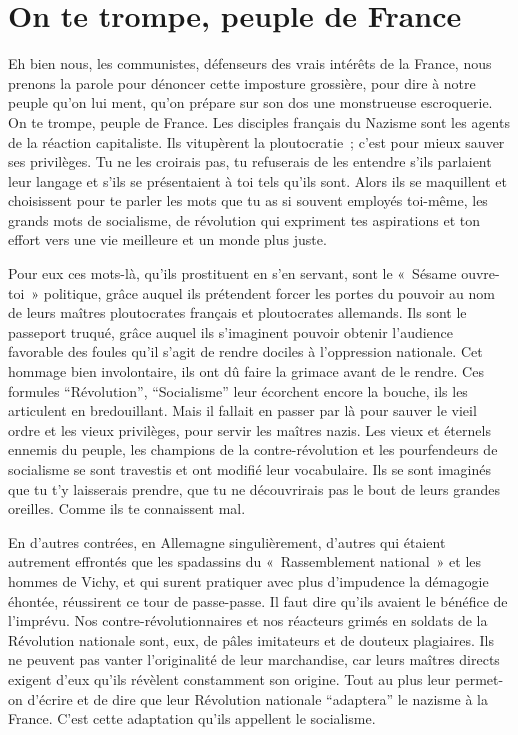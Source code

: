 \documentclass[french,twoside]{book} %
\begin{document}
\section[On te trompe, peuple de France]{On te trompe, peuple de France}
\noindent Eh bien nous, les communistes, défenseurs des vrais intérêts de la France, nous prenons la parole pour dénoncer cette imposture grossière, pour dire à notre peuple qu’on lui ment, qu’on prépare sur son dos une monstrueuse escroquerie. On te trompe, peuple de France. Les disciples français du Nazisme sont les agents de la réaction capitaliste. Ils vitupèrent la ploutocratie ; c’est pour mieux sauver ses privilèges. Tu ne les croirais pas, tu refuserais de les entendre s’ils parlaient leur langage et s’ils se présentaient à toi tels qu’ils sont. Alors ils se maquillent et choisissent pour te parler les mots que tu as si souvent employés toi-même, les grands mots de socialisme, de révolution qui expriment tes aspirations et ton effort vers une vie meilleure et un monde plus juste.\par
Pour eux ces mots-là, qu’ils prostituent en s’en servant, sont le « Sésame ouvre-toi » politique, grâce auquel ils prétendent forcer les portes du pouvoir au nom de leurs maîtres ploutocrates français et ploutocrates allemands. Ils sont le passeport truqué, grâce auquel ils s’imaginent pouvoir obtenir l’audience favorable des foules qu’il s’agit de rendre dociles à l’oppression nationale. Cet hommage bien involontaire, ils ont dû faire la grimace avant de le rendre. Ces formules “Révolution”, “Socialisme” leur écorchent encore la bouche, ils les articulent en bredouillant. Mais il fallait en passer par là pour sauver le vieil ordre et les vieux privilèges, pour servir les maîtres nazis. Les vieux et éternels ennemis du peuple, les champions de la contre-révolution et les pourfendeurs de socialisme se sont travestis et ont modifié leur vocabulaire. Ils se sont imaginés que tu t’y laisserais prendre, que tu ne découvrirais pas le bout de leurs grandes oreilles. Comme ils te connaissent mal.\par
En d’autres contrées, en Allemagne singulièrement, d’autres qui étaient autrement effrontés que les spadassins du « Rassemblement national » et les hommes de Vichy, et qui surent pratiquer avec plus d’impudence la démagogie éhontée, réussirent ce tour de passe-passe. Il faut dire qu’ils avaient le bénéfice de l’imprévu. Nos contre-révolutionnaires et nos réacteurs grimés en soldats de la Révolution nationale sont, eux, de pâles imitateurs et de douteux plagiaires. Ils ne peuvent pas vanter l’originalité de leur marchandise, car leurs maîtres directs exigent d’eux qu’ils révèlent constamment son origine. Tout au plus leur permet-on d’écrire et de dire que leur Révolution nationale “adaptera” le nazisme à la France. C’est cette adaptation qu’ils appellent le socialisme.
\end{document}
